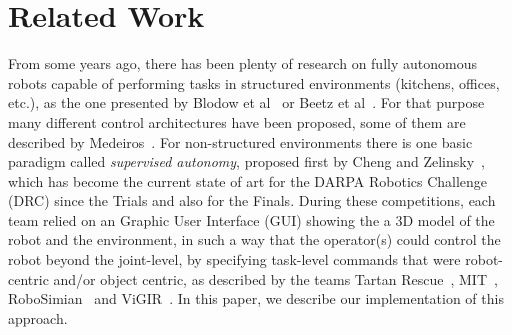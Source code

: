 \section{Related Work}
	\label{sec:related_work}
	
	From some years ago, there has been plenty of research on fully autonomous robots capable of performing
	tasks in structured environments (kitchens, offices, etc.), as the one presented by Blodow et al~\cite{Blodow}
	or Beetz et al~\cite{Beetz}.
	For that purpose many different control architectures have been proposed, some of them are described by
	Medeiros~\cite{Medeiros}.
	For non-structured environments there is one basic paradigm called \emph{supervised autonomy},
	proposed first by Cheng and Zelinsky~\cite{Cheng}, which has become the current state of art for
	the DARPA Robotics Challenge (DRC) since the Trials and also for the Finals.
	During these competitions, each team relied on an Graphic User Interface (GUI) showing the a 3D model of the
	robot and the environment, in such a way that the operator(s) could control the robot beyond the joint-level,
	by specifying task-level commands that were robot-centric and/or object centric, as described by the teams
	Tartan Rescue~\cite{Dellin}, MIT~\cite{Fallon}, RoboSimian~\cite{Hebert} and ViGIR~\cite{Romay}.
	In this paper, we describe our implementation of this approach.